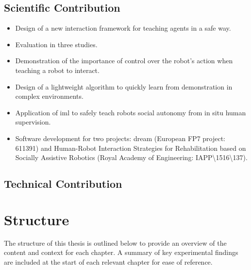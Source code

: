 \subsection{Scientific Contribution}
\begin{itemize}
	\item Design of a new interaction framework for teaching agents in a safe way.
	\item Evaluation in three studies.
	\item Demonstration of the importance of control over the robot's action when teaching a robot to interact.
	\item Design of a lightweight algorithm to quickly learn from demonstration in complex environments.
	\item Application of \gls{iml} to safely teach robots social autonomy from in situ human supervision. 
	\item Software development for two projects: \acrshort{dream} (European FP7 project: 611391) and Human-Robot Interaction Strategies for Rehabilitation based on Socially Assistive Robotics (Royal Academy of Engineering: IAPP\textbackslash1516\textbackslash137).
\end{itemize}

\subsection{Technical Contribution}

\section{Structure}\label{sec:intro-struct}
The structure of this thesis is outlined below to provide an overview of the content and context for each chapter. A summary of key experimental findings are included at the start of each relevant chapter for ease of reference. 

